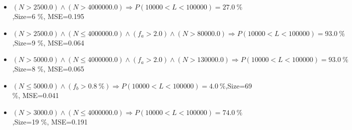 \documentclass[numbered]{CSL}
\begin{document}
\begin{itemize}
\item $(N > 2500.0) \land (N > 4000000.0) \Rightarrow P(10 000 < L < 100 000) = 27.0~\%$,\hfill Size=6 \%, MSE=0.195
\item $(N > 2500.0) \land (N \leq 4000000.0) \land (f_a > 2.0) \land (N > 80000.0) \Rightarrow P(10 000 < L < 100 000) = 93.0~\%$,\hfill Size=9 \%, MSE=0.064
\item $(N > 5000.0) \land (N \leq 4000000.0) \land (f_a > 2.0) \land (N > 130000.0) \Rightarrow P(10 000 < L < 100 000) = 93.0~\%$,\hfill Size=8 \%, MSE=0.065
\item $(N \leq 5000.0) \land (f_b > 0.8~\%) \Rightarrow P(10 000 < L < 100 000) = 4.0~\%$,\hfill Size=69 \%, MSE=0.041
\item $(N > 3000.0) \land (N \leq 4000000.0) \Rightarrow P(10 000 < L < 100 000) = 74.0~\%$,\hfill Size=19 \%, MSE=0.191
\end{itemize}
\end{document}
